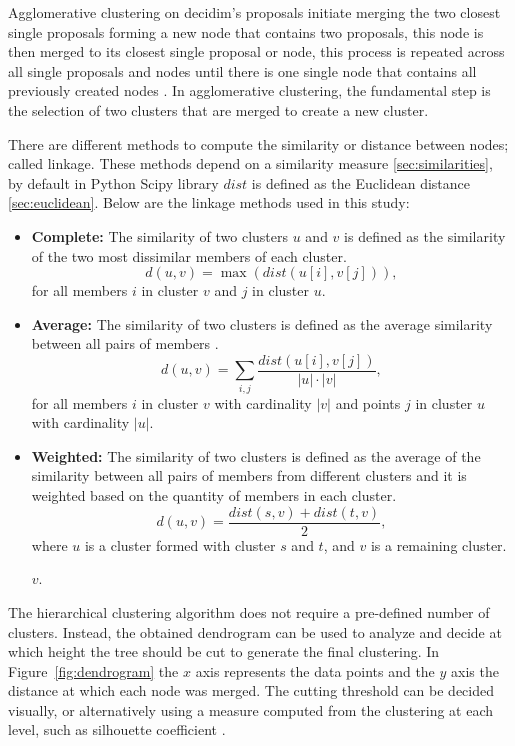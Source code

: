 Agglomerative clustering on decidim's proposals initiate merging the two closest single proposals forming a new node that contains two proposals, this node is then merged to its closest single proposal or node, this process is repeated across all single proposals and nodes until there is one single node that contains all previously created nodes \cite{mullner}. 
In agglomerative clustering, the fundamental step is the selection of two clusters that are merged to create a new cluster.

There are different methods to compute the similarity or distance between nodes; called linkage. These methods depend on a similarity measure \ref{sec:similarities}, by default in Python Scipy library \cite{scipy} $dist$ is defined as the Euclidean distance \ref{sec:euclidean}. Below are the linkage methods used in this study: 
\begin{itemize}[label=]
    \item \textbf{Complete:} The similarity of two clusters $u$ and $v$ is defined as the similarity of the two most dissimilar members of each cluster\cite{mullner}.
    $$d(u,v) = \max(dist(u[i], v[j])),$$ for all members $i$ in cluster $v$ and $j$ in cluster $u$.
    \item \textbf{Average:} The similarity of two clusters is defined as the average similarity between all pairs of members \cite{mullner}.
    $$d(u,v) = \sum_{i,j}\frac{dist(u[i], v[j])}{|u|\cdot|v|},$$
    for all members $i$ in cluster $v$ with cardinality $|v|$ and points $j$ in cluster $u$ with cardinality $|u|$.
    \item \textbf{Weighted:} The similarity of two clusters is defined as the average of the similarity between all pairs of members from different clusters and it is weighted based on the quantity of members in each cluster\cite{mullner}.
    $$d(u,v) = \frac{dist(s,v) + dist(t,v)}{2},$$
where $u$ is a cluster formed with cluster $s$ and $t$, and $v$ is a remaining cluster.


$v$.\end{itemize}

The hierarchical clustering algorithm does not require a pre-defined number of clusters. Instead, the obtained dendrogram can be used to analyze and decide at which height the tree should be cut to generate the final clustering. In Figure~\ref{fig:dendrogram} the $x$ axis represents the data points and the $y$ axis the distance at which each node was merged. The cutting threshold can be decided visually, or alternatively using a measure computed from the clustering at each level, such as silhouette coefficient \cite{han2012mining}. 

